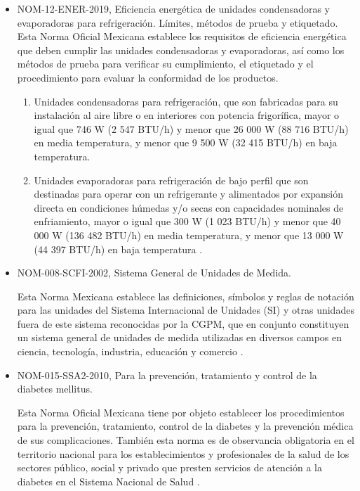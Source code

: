 \begin{enumerate}
		
		\begin{itemize}
			\item NOM-12-ENER-2019, Eficiencia energética de unidades condensadoras y evaporadoras para refrigeración. Límites, métodos de prueba y etiquetado.\\
			Esta Norma Oficial Mexicana establece los requisitos de eficiencia energética que deben cumplir las unidades condensadoras y evaporadoras, así como los métodos de prueba para verificar su cumplimiento, el etiquetado y el procedimiento para evaluar la conformidad de los productos.
			\begin{enumerate}
				\item Unidades condensadoras para refrigeración, que son fabricadas para su instalación al aire libre o en interiores con potencia frigorífica, mayor o igual que 746 W (2 547 BTU/h) y menor que 26 000 W (88 716 BTU/h) en media temperatura, y menor que 9 500 W (32 415 BTU/h) en baja temperatura.
				\item Unidades evaporadoras para refrigeración de bajo perfil que son destinadas para operar con un refrigerante y alimentados por expansión directa en condiciones húmedas y/o secas con capacidades nominales de enfriamiento, mayor o igual que 300 W (1 023 BTU/h) y menor que 40 000 W (136 482 BTU/h) en media temperatura, y menor que 13 000 W (44 397 BTU/h) en baja temperatura \cite{dof-2010}.
			\end{enumerate}
			
			\item  	NOM-008-SCFI-2002, Sistema General de Unidades de Medida. 
			
			Esta Norma Mexicana establece las definiciones, símbolos y reglas de notación para las unidades del Sistema Internacional de Unidades (SI) y otras unidades fuera de este sistema reconocidas por la CGPM, que en conjunto constituyen un sistema general de unidades de medida utilizadas en diversos campos en ciencia, tecnología, industria, educación y comercio \cite{dof-2010-nom008}.
			
			\item NOM-015-SSA2-2010, Para la prevención, tratamiento y control de la diabetes mellitus.
			
			Esta Norma Oficial Mexicana tiene por objeto establecer los procedimientos para la prevención, tratamiento, control de la diabetes y la prevención médica de sus complicaciones.
			También esta norma es de observancia obligatoria en el territorio nacional para los establecimientos y profesionales de la salud de los sectores público, social y privado que presten servicios de atención a la diabetes en el Sistema Nacional de Salud \cite{dof-2010-nom015}.
			

\end{itemize}
\end{enumerate}
